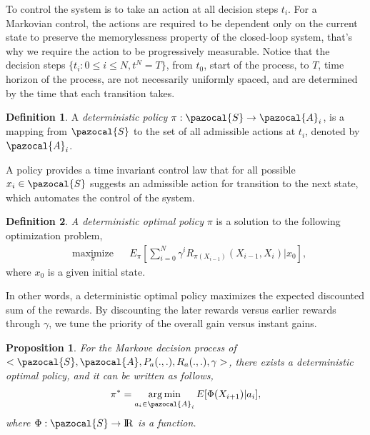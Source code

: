 \documentclass[11pt]{article}
\newtheorem{prop}{Proposition}
\theoremstyle{definition}
\newtheorem{defn}{Definition}
\DeclareMathOperator*{\argmin}{arg\,min}
\begin{document}
To control the system is to take an action at all decision steps $t_i$. For a Markovian control, the actions are required to be dependent only on the current state to preserve the memorylessness property of the closed-loop system, that's why we require the action to be progressively measurable. Notice that the decision steps $\{ t_i: 0 \leq i \leq N, t^N  =T\}$, from $t_0$, start of the process, to $T$, time horizon of the process, are not necessarily uniformly spaced, and are determined by the time that each transition takes. 
\begin{defn}
A \textit{deterministic policy} $\pi : \pazocal{S} \rightarrow \pazocal{A}_i$, is a mapping from $\pazocal{S}$ to the set of all admissible actions at $t_i$, denoted by $\pazocal{A}_i$. 
\end{defn}
A policy provides a time invariant control law that for all possible $x_i \in \pazocal{S}$ suggests an admissible action for transition to the next state, which automates the control of the system.
\begin{defn}
\textit{A deterministic optimal policy} $\pi$ is a solution to the following optimization problem,
\begin{equation}\label{equ_opt1}
\begin{aligned}
& \underset{\pi}{\text{maximize}}
& & E_{\pi}[\sum_{i = 0}^N \gamma^i R_{\pi(X_{i-1})}(X_{i-1}, X_{i}) | x_0],
\end{aligned}
\end{equation}
where $x_0$ is a given initial state.
\end{defn}
In other words, a deterministic optimal policy maximizes the expected discounted sum of the rewards. By discounting the later rewards versus earlier rewards through $\gamma$, we tune the priority of the overall gain versus instant gains.
\begin{prop} \label{prop_main}
For the Markove decision process of $<\pazocal{S},\pazocal{A}, P_a(.,.), R_a(.,.), \gamma>$, there exists a deterministic optimal policy, and it can be written as follows, 
\begin{equation}\label{equ_opt_pol}
\pi^*= \argmin_{a_{i} \in \pazocal{A}_i} E[\Phi(X_{{i+1}}) | a_{i}],
\end{equation}
where $\Phi: \pazocal{S} \rightarrow \rm I\!R$ is a function.
\end{prop}
\end{document}
